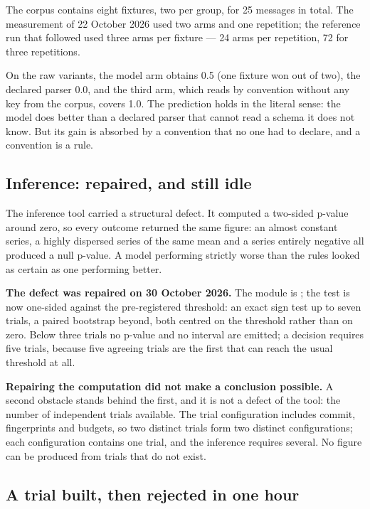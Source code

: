 The corpus contains eight fixtures, two per group, for 25 messages in total. The
measurement of 22 October 2026 used two arms and one repetition; the reference run
that followed used three arms per fixture --- 24 arms per repetition, 72 for three
repetitions.

On the raw variants, the model arm obtains 0.5 (one fixture won out of two), the
declared parser 0.0, and the third arm, which reads by convention without any key
from the corpus, covers 1.0. The prediction holds in the literal sense: the model
does better than a declared parser that cannot read a schema it does not know. But
its gain is absorbed by a convention that no one had to declare, and a convention
is a rule.

\subsection{Inference: repaired, and still idle}

The inference tool carried a structural defect. It computed a two-sided p-value
around zero, so every outcome returned the same figure: an almost constant series,
a highly dispersed series of the same mean and a series entirely negative all
produced a null p-value. A model performing strictly worse than the rules looked as
certain as one performing better.

\textbf{The defect was repaired on 30 October 2026.} The module is
; the test is now one-sided
against the pre-registered threshold: an exact sign test up to seven trials, a
paired bootstrap beyond, both centred on the threshold rather than on zero. Below
three trials no p-value and no interval are emitted; a decision requires five
trials, because five agreeing trials are the first that can reach the usual
threshold at all.

\textbf{Repairing the computation did not make a conclusion possible.} A second
obstacle stands behind the first, and it is not a defect of the tool: the number of
independent trials available. The trial configuration includes commit,
fingerprints and budgets, so two distinct trials form two distinct configurations;
each configuration contains one trial, and the inference requires several. No
figure can be produced from trials that do not exist.

\subsection{A trial built, then rejected in one hour}


